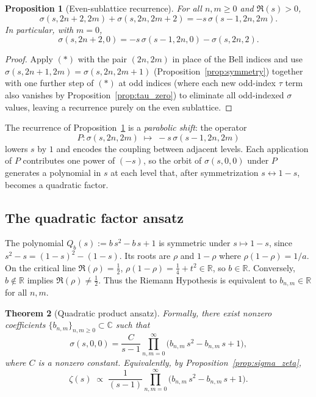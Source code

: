 \documentclass[article]{article}
\theoremstyle{plain}
\newtheorem{theorem}{Theorem}[section]
\newtheorem{proposition}[theorem]{Proposition}
\theoremstyle{definition}
\newcommand{\R}{\mathbb{R}}
\newcommand{\C}{\mathbb{C}}
\begin{document}
\begin{proposition}[Even-sublattice recurrence]\label{prop:even_recurrence}
For all $n,m\ge 0$ and $\Re(s)>0$,
\[
  \sigma(s,2n+2,2m)+\sigma(s,2n,2m+2)=-s\,\sigma(s-1,2n,2m).
\]
In particular, with $m=0$,
\[
  \sigma(s,2n+2,0)=-s\,\sigma(s-1,2n,0)-\sigma(s,2n,2).
\]
\end{proposition}

\begin{proof}
Apply $(*)$ with the pair $(2n,2m)$ in place of the Bell indices and use
$\sigma(s,2n+1,2m)=\sigma(s,2n,2m+1)$
(Proposition~\ref{prop:symmetry}) together with one further step of $(*)$
at odd indices (where each new odd-index $\tau$ term also vanishes by
Proposition~\ref{prop:tau_zero}) to eliminate all odd-indexed $\sigma$ values,
leaving a recurrence purely on the even sublattice.
\end{proof}

The recurrence of Proposition~\ref{prop:even_recurrence} is a
\emph{parabolic shift}: the operator
\[
  P:\sigma(s,2n,2m)\;\longmapsto\;-s\,\sigma(s-1,2n,2m)
\]
lowers $s$ by $1$ and encodes the coupling between adjacent levels.
Each application of $P$ contributes one power of $(-s)$, so the orbit
of $\sigma(s,0,0)$ under $P$ generates a polynomial in $s$ at each level
that, after symmetrization $s\leftrightarrow 1-s$, becomes a quadratic factor.

\subsection{The quadratic factor ansatz}

The polynomial $Q_{b}(s):=b\,s^{2}-b\,s+1$ is symmetric under $s\mapsto 1-s$,
since $s^{2}-s=(1-s)^{2}-(1-s)$.
Its roots are $\rho$ and $1-\rho$ where $\rho(1-\rho)=1/a$.
On the critical line $\Re(\rho)=\tfrac{1}{2}$, $\rho(1-\rho)=\tfrac{1}{4}+t^{2}\in\R$,
so $b\in\R$.  Conversely, $b\notin\R$ implies $\Re(\rho)\ne\tfrac{1}{2}$.
Thus the Riemann Hypothesis is equivalent to $b_{n,m}\in\R$ for all $n,m$.

\begin{theorem}[Quadratic product ansatz]\label{thm:ansatz}
Formally, there exist nonzero coefficients $\{b_{n,m}\}_{n,m\ge 0}\subset\C$
such that
\[
  \sigma(s,0,0)
  =\frac{C}{s-1}\prod_{n,m=0}^{\infty}
  \bigl(b_{n,m}\,s^{2}-b_{n,m}\,s+1\bigr),
\]
where $C$ is a nonzero constant.
Equivalently, by Proposition~\ref{prop:sigma_zeta},
\[
  \zeta(s)\;\propto\;
  \frac{1}{(s-1)}
  \prod_{n,m=0}^{\infty}
  \bigl(b_{n,m}\,s^{2}-b_{n,m}\,s+1\bigr).
\]
\end{theorem}
\end{document}

